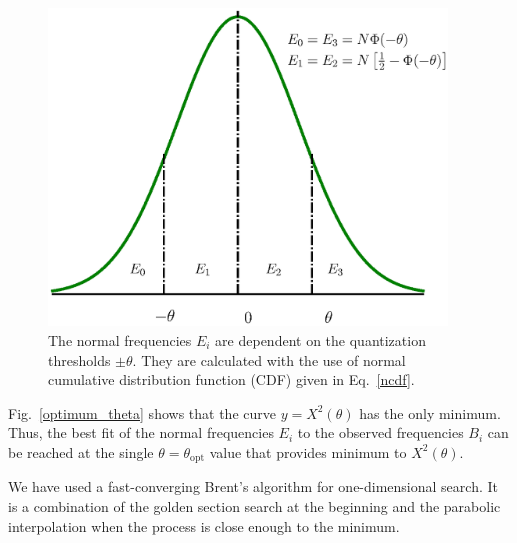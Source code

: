 \documentclass[letterpaper,twoside,12pt]{article}
\begin{document}
\begin{figure}[ht!]
  \begin{center}
  \includegraphics[width=25pc]{fig_npdf_areas.eps}
  \caption{\small The normal frequencies $E_i$ are dependent on the quantization thresholds $\pm\theta$. They are calculated with the use of normal cumulative distribution function (CDF) given in Eq.~\eqref{ncdf}.}
  \label{npdf_areas}
  \end{center}
\end{figure}

Fig.~\ref{optimum_theta} shows that the curve $y = X^2(\theta)$ has the only minimum. Thus, the best fit of the normal frequencies $E_i$ to the observed frequencies $B_i$ can be reached at the single $\theta=\theta_\text{opt}$ value that provides minimum to $X^2(\theta)$. 

We have used a fast-converging Brent's algorithm for one-dimensional search. It is a combination of the golden section search at the beginning and the parabolic interpolation when the process is close enough to the minimum.
\end{document}
